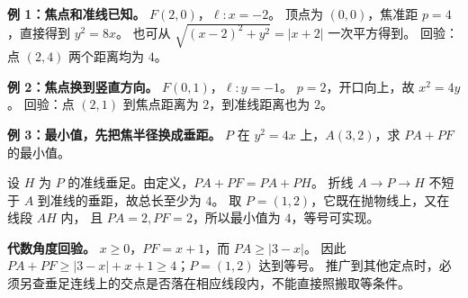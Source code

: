 \begin{examplebox}
\textbf{例 1：焦点和准线已知。} $F(2,0)$，$\ell:x=-2$。
顶点为 $(0,0)$，焦准距 $p=4$，直接得到 $\boxed{y^2=8x}$。
也可从 $\sqrt{(x-2)^2+y^2}=|x+2|$ 一次平方得到。
回验：点 $(2,4)$ 两个距离均为 $4$。

\medskip
\textbf{例 2：焦点换到竖直方向。} $F(0,1)$，$\ell:y=-1$。
$p=2$，开口向上，故 $\boxed{x^2=4y}$。
回验：点 $(2,1)$ 到焦点距离为 $2$，到准线距离也为 $2$。
\end{examplebox}
\clearpage
\begin{examplebox}
\textbf{例 3：最小值，先把焦半径换成垂距。}
$P$ 在 $y^2=4x$ 上，$A(3,2)$，求 $PA+PF$ 的最小值。

设 $H$ 为 $P$ 的准线垂足。由定义，$PA+PF=PA+PH$。
折线 $A\to P\to H$ 不短于 $A$ 到准线的垂距，故总长至少为 $4$。
取 $P=(1,2)$，它既在抛物线上，又在线段 $AH$ 内，
且 $PA=2,PF=2$，所以最小值为 $\boxed{4}$，等号可实现。

\textbf{代数角度回验。} $x\ge0$，$PF=x+1$，而 $PA\ge|3-x|$。
因此 $PA+PF\ge |3-x|+x+1\ge4$；$P=(1,2)$ 达到等号。
推广到其他定点时，必须另查垂足连线上的交点是否落在相应线段内，不能直接照搬取等条件。
\end{examplebox}
\clearpage

